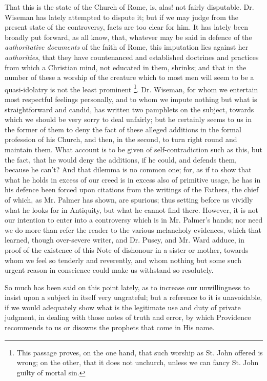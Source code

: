 That this is the state of the Church of Rome, is, alas! not fairly
disputable. Dr. Wiseman has lately attempted to dispute it; but if we
may judge from the present state of the controversy, facts are too
clear for him. It has lately been broadly put forward, as all know,
that, whatever may be said in defence of the \emph{authoritative
documents} of the faith of Rome, this imputation lies against her \emph{authorities},
that they have countenanced and established doctrines and practices
from which a Christian mind, not educated in them, shrinks; and that
in the number of these a worship of the creature which to most men
will seem to be a quasi-idolatry is not the least prominent \footnote{This passage
proves, on the one hand, that such worship as St. John offered is
wrong; on the other, that it does not unchurch, unless we can fancy
St. John guilty of mortal sin.}. Dr. Wiseman, for whom we entertain most respectful feelings
personally, and to whom we impute nothing but what is straightforward
and candid, has written two pamphlets on the subject, towards which we
should be very sorry to deal unfairly; but he certainly seems to us in
the former of them to deny the fact of these alleged additions
in the formal profession of his Church, and then, in the second, to
turn right round and maintain them. What account is to be given of
self-contradiction such as this, but the fact, that he would deny the
additions, if he could, and defends them, because he can't? And that
dilemma is no common one; for, as if to show that what he holds in
excess of our creed is in excess also of primitive usage, he has in
his defence been forced upon citations from the writings of the
Fathers, the chief of which, as Mr. Palmer has shown, are spurious;
thus setting before us vividly what he looks for in Antiquity, but
what he cannot find there. However, it is not our intention to enter
into a controversy which is in Mr. Palmer's hands; nor need we do more
than refer the reader to the various melancholy evidences, which that
learned, though over-severe writer, and Dr. Pusey, and Mr. Ward
adduce, in proof of the existence of this Note of dishonour in a
sister or mother, towards whom we feel so tenderly and reverently, and
whom nothing but some such urgent reason in conscience could make us
withstand so resolutely.

So much has been said on this point lately, as to increase our
unwillingness to insist upon a subject in itself very ungrateful; but
a reference to it is unavoidable, if we would adequately show what is
the legitimate use and duty of private judgment, in dealing with those
notes of truth and error, by which Providence recommends to us or
disowns the prophets that come in His name.


